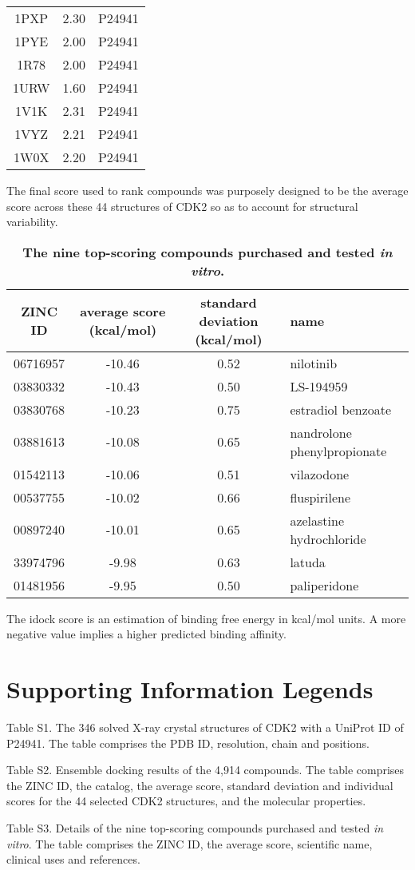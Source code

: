 \documentclass[10pt]{article}
\begin{document}
\begin{table}
\begin{tabular}{ccc}
1PXP & 2.30 & P24941\\
1PYE & 2.00 & P24941\\
1R78 & 2.00 & P24941\\
1URW & 1.60 & P24941\\
1V1K & 2.31 & P24941\\
1VYZ & 2.21 & P24941\\
1W0X & 2.20 & P24941\\
\hline
\end{tabular}
\begin{flushleft}\label{PDBs} The final score used to rank compounds was purposely designed to be the average score across these 44 structures of CDK2 so as to account for structural variability.
\end{flushleft}
\end{table}

\begin{table}
\caption{
\bf{The nine top-scoring compounds purchased and tested \textit{in vitro}.}}
\begin{tabular}{cccl}
\hline
ZINC ID & average score (kcal/mol) & standard deviation (kcal/mol) & name\\
\hline
06716957 & -10.46 & 0.52 & nilotinib\\
03830332 & -10.43 & 0.50 & LS-194959\\
03830768 & -10.23 & 0.75 & estradiol benzoate\\
03881613 & -10.08 & 0.65 & nandrolone phenylpropionate\\
01542113 & -10.06 & 0.51 & vilazodone\\
00537755 & -10.02 & 0.66 & fluspirilene\\
00897240 & -10.01 & 0.65 & azelastine hydrochloride\\
33974796 &  -9.98 & 0.63 & latuda\\
01481956 &  -9.95 & 0.50 & paliperidone\\
\hline
\end{tabular}
\begin{flushleft}\label{Top9} The idock score is an estimation of binding free energy in kcal/mol units. A more negative value implies a higher predicted binding affinity.
\end{flushleft}
\end{table}

\section*{Supporting Information Legends}

Table S1. The 346 solved X-ray crystal structures of CDK2 with a UniProt ID of P24941. The table comprises the PDB ID, resolution, chain and positions.%

Table S2. Ensemble docking results of the 4,914 compounds. The table comprises the ZINC ID, the catalog, the average score, standard deviation and individual scores for the 44 selected CDK2 structures, and the molecular properties.%

Table S3. Details of the nine top-scoring compounds purchased and tested \textit{in vitro}. The table comprises the ZINC ID, the average score, scientific name, clinical uses and references.%
\end{document}
